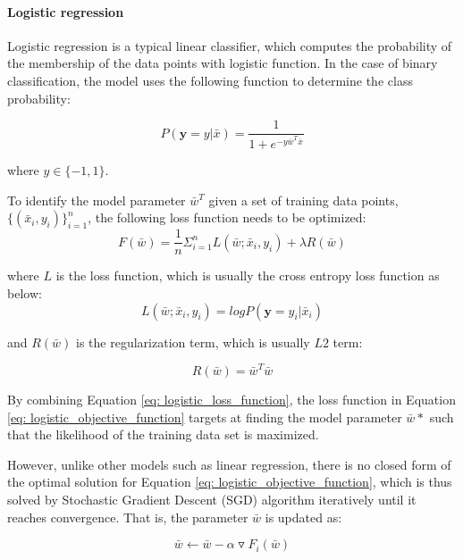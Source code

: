\paragraph{Logistic regression}
Logistic regression is a typical linear classifier, which computes the probability of the membership of the data points with logistic function. In the case of binary classification, the model uses the following function to determine the class probability:

\begin{equation}\label{eq: logistic_regression_prob}
    P(\textbf{y}=y|\bar{x}) = \frac{1}{1+e^{-y\bar{w}^T\bar{x}}}
\end{equation}

where $y \in \{-1,1\}$.

To identify the model parameter $\bar{w}^T$ given a set of training data points, $\{(\bar{x}_i, y_i)\}_{i=1}^n$, the following loss function needs to be optimized:
\begin{equation}\label{eq: logistic_objective_function}
    F(\bar{w}) = \frac{1}{n}\Sigma_{i=1}^nL(\bar{w};\bar{x}_i, y_i) + \lambda R(\bar{w})
\end{equation}

where $L$ is the loss function, which is usually the cross entropy loss function as below:
\begin{equation}\label{eq: logistic_loss_function}
    L(\bar{w}; \bar{x}_i, y_i) = logP(\textbf{y}=y_i|\bar{x}_i)
\end{equation}

and $R(\bar{w})$ is the regularization term, which is usually $L2$ term:

\begin{equation}
    R(\bar{w}) = \bar{w}^T\bar{w}
\end{equation}


By combining Equation \ref{eq: logistic_loss_function}, the loss function in Equation \ref{eq: logistic_objective_function} targets at finding the model parameter $\bar{w}*$ such that the likelihood of the training data set is maximized. 

However, unlike other models such as linear regression, there is no closed form of the optimal solution for Equation \ref{eq: logistic_objective_function}, which is thus solved by Stochastic Gradient Descent (SGD) algorithm \cite{robert2014machine} iteratively until it reaches convergence. That is, the parameter $\bar{w}$ is updated as:

\begin{equation}
    \bar{w} \leftarrow \bar{w} - \alpha \triangledown F_i(\bar{w})
\end{equation}

